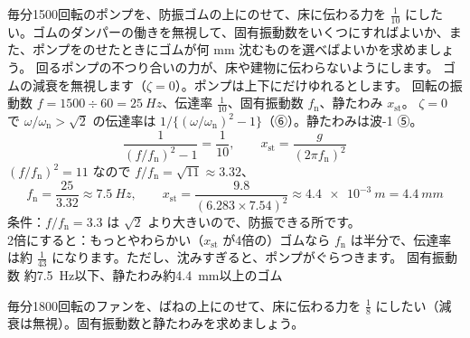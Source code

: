 \label{ph:波-2:ex4}
\begin{phreidai}[ポンプの防振ゴムを選ぶ]
毎分1500回転のポンプを、防振ゴムの上にのせて、床に伝わる力を $\tfrac{1}{10}$ にしたい。ゴムのダンパーの働きを無視して、固有振動数をいくつにすればよいか、また、ポンプをのせたときにゴムが何 mm 沈むものを選べばよいかを求めましょう。
\phbamen
回るポンプの不つり合いの力が、床や建物に伝わらないようにします。
\phmushi
ゴムの減衰を無視します（$\zeta=0$）。ポンプは上下にだけゆれるとします。
\phzu
回転の振動数 $f=1500\div60=\qty{25}{Hz}$、伝達率 $\tfrac{1}{10}$、固有振動数 $f_{\mathrm n}$、静たわみ $x_{\mathrm{st}}$。
\phriyu
$\zeta=0$ で $\omega/\omega_{\mathrm n}>\sqrt2$ の伝達率は $1/\{(\omega/\omega_{\mathrm n})^2-1\}$（⑥）。静たわみは波-1 ⑤。
\phtateru
\[\frac{1}{(f/f_{\mathrm n})^2-1}=\frac{1}{10},\qquad x_{\mathrm{st}}=\frac{g}{(2\pi f_{\mathrm n})^2}\]
\phtoku
$(f/f_{\mathrm n})^2=11$ なので $f/f_{\mathrm n}=\sqrt{11}\approx3.32$、
\[f_{\mathrm n}=\frac{25}{3.32}\approx\qty{7.5}{Hz},\qquad x_{\mathrm{st}}=\frac{9.8}{(6.283\times7.54)^2}\approx\qty{4.4e-3}{m}=\qty{4.4}{mm}\]
\phtashikame
条件：$f/f_{\mathrm n}=3.3$ は $\sqrt2$ より大きいので、防振できる所です。\\
2倍にすると：もっとやわらかい（$x_{\mathrm{st}}$ が4倍の）ゴムなら $f_{\mathrm n}$ は半分で、伝達率は約 $\tfrac{1}{43}$ になります。ただし、沈みすぎると、ポンプがぐらつきます。
\kotae 固有振動数 約\qty{7.5}{Hz}以下、静たわみ約\qty{4.4}{mm}以上のゴム
\end{phreidai}
\begin{jibun}
毎分1800回転のファンを、ばねの上にのせて、床に伝わる力を $\tfrac{1}{8}$ にしたい（減衰は無視）。固有振動数と静たわみを求めましょう。
\end{jibun}

